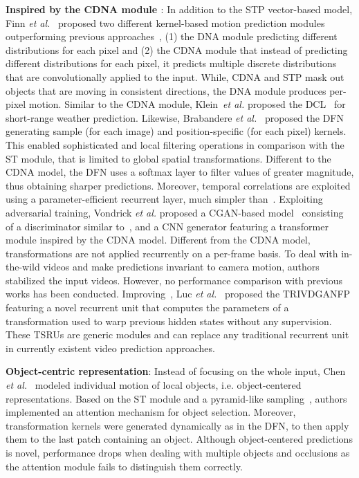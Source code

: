 \vspace*{0.1cm}\noindent\textbf{Inspired by the \ac{CDNA} module \cite{Finn2016}}: In addition to the \ac{STP} vector-based model, Finn \textit{et al.}~\cite{Finn2016} proposed two different kernel-based motion prediction modules outperforming previous approaches~\cite{Mathieu2016,Oh2015}, (1) the \ac{DNA} module predicting different distributions for each pixel and (2) the \ac{CDNA} module that instead of predicting different distributions for each pixel, it predicts multiple discrete distributions that are convolutionally applied to the input. While, \ac{CDNA} and \ac{STP} mask out objects that are moving in consistent directions, the \ac{DNA} module produces per-pixel motion. Similar to the \ac{CDNA} module, Klein~\textit{et al.} proposed the \ac{DCL}~\cite{Klein2015} for short-range weather prediction. Likewise, Brabandere \textit{et al.}~\cite{Brabandere2016} proposed the \ac{DFN} generating sample (for each image) and position-specific (for each pixel) kernels. This enabled sophisticated and local filtering operations in comparison with the \ac{ST} module, that is limited to global spatial transformations. Different to the \ac{CDNA} model, the \ac{DFN} uses a softmax layer to filter values of greater magnitude, thus obtaining sharper predictions. Moreover, temporal correlations are exploited using a parameter-efficient recurrent layer, much simpler than~\cite{Srivastava2015,Shi2015}. Exploiting adversarial training, Vondrick \textit{et al.} proposed a \ac{CGAN}-based model~\cite{Vondrick2017} consisting of a discriminator similar to~\cite{Vondrick2016}, and a \ac{CNN} generator featuring a transformer module inspired by the \ac{CDNA} model. Different from the \ac{CDNA} model, transformations are not applied recurrently on a per-frame basis. To deal with in-the-wild videos and make predictions invariant to camera motion, authors stabilized the input videos. However, no performance comparison with previous works has been conducted. Improving~\cite{Clark2019}, Luc \textit{et al.}~\cite{Luc2020} proposed the \ac{TRIVDGANFP} featuring a novel recurrent unit that computes the parameters of a transformation used to warp previous hidden states without any supervision. These \acp{TSRU} are generic modules and can replace any traditional recurrent unit in currently existent video prediction approaches.

\vspace*{0.1cm}\noindent\textbf{Object-centric representation}: Instead of focusing on the whole input, Chen \textit{et al.}~\cite{Chen2017} modeled individual motion of local objects, i.e. object-centered representations. Based on the \ac{ST} module and a pyramid-like sampling~\cite{He2015}, authors implemented an attention mechanism for object selection. Moreover, transformation kernels were generated dynamically as in the \ac{DFN}, to then apply them to the last patch containing an object. Although object-centered predictions is novel, performance drops when dealing with multiple objects and occlusions as the attention module fails to distinguish them correctly.

